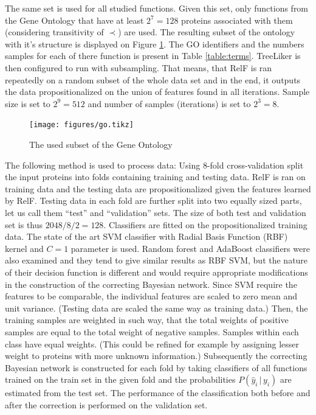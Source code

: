 \documentclass[11pt,twoside,a4paper]{book}
\begin{document}
The same set is used for all studied functions.
Given this set, only functions from the Gene Ontology that have at least $2^7 = 128$
proteins associated with them (considering transitivity of $\prec$) are used.
The resulting subset of the ontology with it's structure is displayed on Figure \ref{fig:go}.
The GO identifiers and the numbers samples for each of there function is present in Table \ref{table:terms}.  
TreeLiker is then configured to run with subsampling.
That means, that RelF is ran repeatedly on a random subset of the whole data set
and in the end, it outputs the data propositionalized on the
union of features found in all iterations.
Sample size is set to $2^9=512$ and number of samples (iterations) is set to $2^3=8$.


\begin{landscape}

\begin{figure}[h]
\begin{center}
\begin{tiny}
\texttt{[image: figures/go.tikz]}
\end{tiny}
\caption{The used subset of the Gene Ontology}
\label{fig:go}
\end{center}
\end{figure}
\end{landscape}

The following method is used to process data:
Using 8-fold cross-validation split the input proteins into folds
containing training and testing data.
RelF is ran on training data and the testing 
data are propositionalized given the features learned by RelF.
Testing data in each fold are further split into two equally sized parts,
let us call them ``test'' and ``validation'' sets.
The size of both test and validation set is thus $2048 / 8 / 2 =  128$.
Classifiers are fitted on the propositionalized training data.
The state of the art SVM classifier with Radial Basis Function (RBF)
kernel and $C = 1$ parameter is used.
Random forest and AdaBoost classifiers were also examined 
and they tend to give similar results as RBF SVM,
but the nature of their decision function is different
and would require appropriate modifications in the construction of the 
correcting Bayesian network.
Since SVM require the features to be comparable,
the individual features are scaled to zero mean and unit variance.
(Testing data are scaled the same way as training data.)
Then, the training samples are weighted in such way, that the total weights
of positive samples are equal to the total weight of negative samples.
Samples within each class have equal weights. 
(This could be refined for example by assigning lesser weight
to proteins with more unknown information.)
Subsequently the correcting Bayesian network is constructed
for each fold by taking classifiers of all functions trained
on the train set in the given fold
and the probabilities $P(\hat{y}_i\,|\,y_i)$ are estimated from the test set.
The performance of the classification both before and after the correction
is performed on the validation set.
\end{document}
